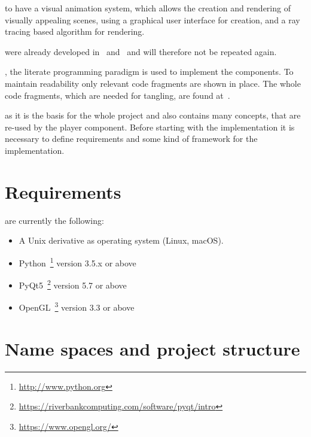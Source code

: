 \documentclass[%
    a4paper,    %
    justified,  %
    nobib,      %
    openany     %
]{tufte-book}
\begin{document}
 to have a visual animation system, which allows
the creation and rendering of visually appealing scenes, using a graphical user
interface for creation, and a ray tracing based algorithm for
rendering.~

 were already developed
in~ and~ and will
therefore not be repeated again.

, the literate programming
paradigm is used to implement the components. To maintain readability only
relevant code fragments are shown in place. The whole code fragments, which are
needed for tangling, are found at~.

 as it is the basis for the
whole project and also contains many concepts, that are re-used by the player
component. Before starting with the implementation it is necessary to define
requirements and some kind of framework for the implementation.


\section{Requirements}
\label{appendix:sec:requirements}

 are currently the
following:

\begin{itemize}
  \item A Unix derivative as operating system (Linux, macOS).
  \item Python~\footnote{\url{http://www.python.org}} version 3.5.x or above
  \item PyQt5~\footnote{%
      \url{https://riverbankcomputing.com/software/pyqt/intro}} version 5.7 or
    above
  \item OpenGL~\footnote{\url{https://www.opengl.org/}} version 3.3 or above
\end{itemize}%

\section{Name spaces and project structure}
\label{appendix:sec:name-spaces}
\end{document}
